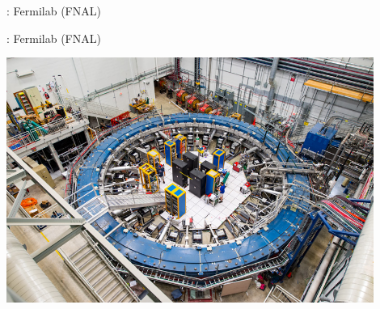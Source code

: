\documentclass[12pt,notes]{beamer}
\begin{document}


\begin{frame}{\insertsection: Fermilab (FNAL)}
  \begin{center}
    \cite{muon-g-2-moving}
  \end{center}
\end{frame}


\begin{frame}{\insertsection: Fermilab (FNAL)}
  \begin{center}
    \includegraphics[width=0.9\textwidth]{img/FNAL-17-0188-17}
    \footnotesize \cite{FNAL-ring}
  \end{center}
\end{frame}
\end{document}
